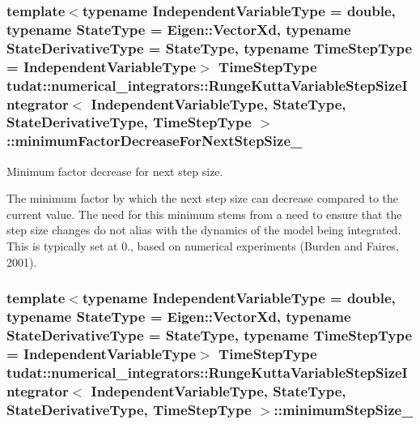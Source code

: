 \subsubsection[{\texorpdfstring{minimum\+Factor\+Decrease\+For\+Next\+Step\+Size\+\_\+}{minimumFactorDecreaseForNextStepSize_}}]{\setlength{\rightskip}{0pt plus 5cm}template$<$typename Independent\+Variable\+Type  = double, typename State\+Type  = Eigen\+::\+Vector\+Xd, typename State\+Derivative\+Type  = State\+Type, typename Time\+Step\+Type  = Independent\+Variable\+Type$>$ Time\+Step\+Type {\bf tudat\+::numerical\+\_\+integrators\+::\+Runge\+Kutta\+Variable\+Step\+Size\+Integrator}$<$ Independent\+Variable\+Type, State\+Type, State\+Derivative\+Type, Time\+Step\+Type $>$\+::minimum\+Factor\+Decrease\+For\+Next\+Step\+Size\+\_\+\hspace{0.3cm}{\ttfamily [protected]}}\hypertarget{classtudat_1_1numerical__integrators_1_1RungeKuttaVariableStepSizeIntegrator_ae478abe53ab327c5a8e4f8ca978123f6}{}\label{classtudat_1_1numerical__integrators_1_1RungeKuttaVariableStepSizeIntegrator_ae478abe53ab327c5a8e4f8ca978123f6}


Minimum factor decrease for next step size. 

The minimum factor by which the next step size can decrease compared to the current value. The need for this minimum stems from a need to ensure that the step size changes do not alias with the dynamics of the model being integrated. This is typically set at 0., based on numerical experiments (Burden and Faires, 2001). 
\subsubsection[{\texorpdfstring{minimum\+Step\+Size\+\_\+}{minimumStepSize_}}]{\setlength{\rightskip}{0pt plus 5cm}template$<$typename Independent\+Variable\+Type  = double, typename State\+Type  = Eigen\+::\+Vector\+Xd, typename State\+Derivative\+Type  = State\+Type, typename Time\+Step\+Type  = Independent\+Variable\+Type$>$ Time\+Step\+Type {\bf tudat\+::numerical\+\_\+integrators\+::\+Runge\+Kutta\+Variable\+Step\+Size\+Integrator}$<$ Independent\+Variable\+Type, State\+Type, State\+Derivative\+Type, Time\+Step\+Type $>$\+::minimum\+Step\+Size\+\_\+\hspace{0.3cm}{\ttfamily [protected]}}\hypertarget{classtudat_1_1numerical__integrators_1_1RungeKuttaVariableStepSizeIntegrator_a7055fda3b282fa93820597e2e7ee1f81}{}\label{classtudat_1_1numerical__integrators_1_1RungeKuttaVariableStepSizeIntegrator_a7055fda3b282fa93820597e2e7ee1f81}


